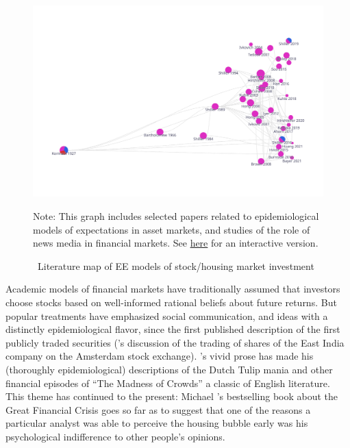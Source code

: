 


\begin{figure}[!ht] \centering  %
  \caption{ ~Literature map of EE models of stock/housing market investment}
  \label{fig:graph_investment}
  \includegraphics[width=1.5\textwidth]{./figures/graph_investment}
  \begin{flushleft}
    {\footnotesize Note: This graph includes selected papers related to epidemiological models of expectations in asset markets, and studies of the role of news media in financial markets. See \href{https://app.litmaps.co/shared/E25276CA-8725-437B-8241-11961EFB3FB4}{here} for an interactive version.}
  \end{flushleft}
\end{figure}

Academic models of financial markets have traditionally assumed that investors choose stocks based on well-informed rational beliefs about future returns.  But popular treatments have emphasized social communication, and ideas with a distinctly epidemiological flavor, since the first published description of  the first publicly traded securities (\cite{vegaConfusion}'s discussion of the trading of shares of the East India company on the Amsterdam stock exchange).  \cite{mackay1850memoirs}'s vivid prose has made his (thoroughly epidemiological) descriptions of the Dutch Tulip mania and other financial episodes of ``The Madness of Crowds'' a classic of English literature.  This theme has continued to the present: Michael \cite{lewis2011big}'s bestselling book about the Great Financial Crisis goes so far as to suggest that one of the reasons a particular analyst was able to perceive the housing bubble early was his psychological indifference to other people's opinions.

